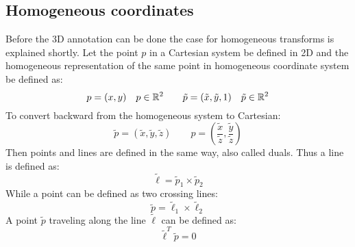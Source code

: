 \subsection{Homogeneous coordinates}%
\label{sub:Homogeneous_coordinates}
Before the 3D annotation can be done the case for homogeneous transforms is explained shortly.
Let the point $p$ in a Cartesian system be defined in 2D and the homogeneous representation of the same point in homogeneous coordinate system be defined as:
\begin{equation}
    p=(x,y)\quad p\in \mathbb{R}^2 \qquad \tilde p=(\tilde x,\tilde y,1)\quad \tilde p\in \mathbb{R}^2
\end{equation}
To convert backward from the homogeneous system to Cartesian:
\begin{equation}
    \tilde{p}=(\tilde{x}, \tilde{y}, \tilde{z})\qquad p = (\frac{\tilde{x}}{\tilde{z}}, \frac{\tilde{y}}{\tilde{z}})
\end{equation}
Then points and lines are defined in the same way, also called duals.
Thus a line is defined as:
\begin{equation}
    \tilde \ell = \tilde p_1\times\tilde p_2
\end{equation}
While a point can be defined as two crossing lines:
\begin{equation}
    \tilde p = \tilde\ell_1 \times \tilde\ell_2
\end{equation}
A point $\tilde{p}$ traveling along the line $\tilde{\ell}$ can be defined as:
\begin{equation}
    \tilde\ell^T\tilde p=0
\end{equation}


